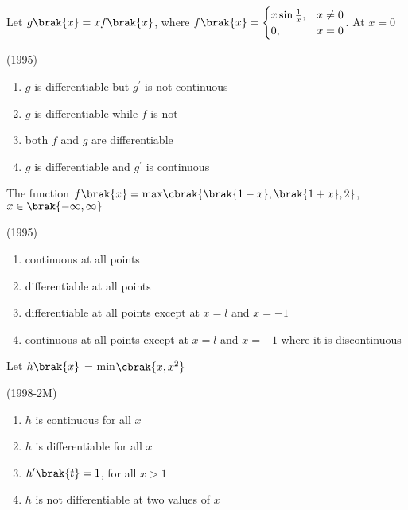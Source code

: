 \iffalse
\title{11. Limits, Continuity and Differentiability}
\author{EE24BTECH11049 \\ Patnam Shariq Faraz Muhammed}
\section*{mcq-multiple}
\fi

    \item 
    Let $g\brak{x}=xf\brak{x}$, where $f\brak{x} = \begin{cases}
        x\sin\frac{1}{x}, & x\neq 0\\
        0, & x=0
    \end{cases}$. At $x=0$ 
	
    \hfill(1995)
    
    \begin{enumerate}
      	\item $g$ is differentiable but $g^{\prime}$ is not continuous
        \item $g$ is differentiable while $f$ is not
        \item both $f$ and $g$ are differentiable
	\item $g$ is differentiable and $g^{\prime}$ is continuous 
    \end{enumerate}

    \item 
    The function $f\brak{x} = \text{max}\cbrak{\brak{1-x},\brak{1+x},2}$, $x\in \brak{-\infty,\infty}$  

    \hfill(1995)
    
    \begin{enumerate}    
        \item continuous at all points
        \item differentiable at all points
        \item differentiable at all points except at $x=l$ and $x=-1$
        \item continuous at all points except at $x=l$ and $x=-1$ where it is discontinuous
    \end{enumerate}

    \item 
    Let $h\brak{x}$ = min$\cbrak{x,x^{2}}$ 
    
    \hfill(1998-2M)

    \begin{enumerate}
	\item $h$ is continuous for all $x$
        \item $h$ is differentiable for all $x$
	\item $h^{\prime}\brak{t}=1$, for all $x>1$
        \item $h$ is not differentiable at two values of $x$
    \end{enumerate}

